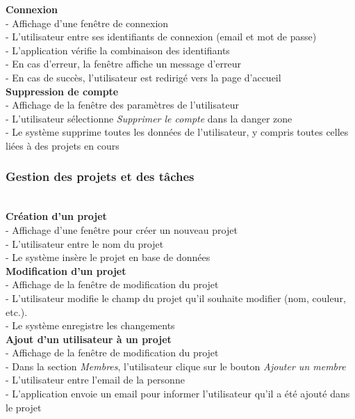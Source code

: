 \documentclass[conference]{IEEEtran}
\begin{document}
\textbf{Connexion}\\
- Affichage d'une fenêtre de connexion\\
- L'utilisateur entre ses identifiants de connexion (email et mot de passe)\\
- L'application vérifie la combinaison des identifiants\\
- En cas d'erreur, la fenêtre affiche un message d'erreur\\
- En cas de succès, l'utilisateur est redirigé vers la page d'accueil\\

\textbf{Suppression de compte}\\
- Affichage de la fenêtre des paramètres de l'utilisateur\\
- L'utilisateur sélectionne \textit{Supprimer le compte} dans la danger zone\\
- Le système supprime toutes les données de l'utilisateur, y compris toutes celles liées à des projets en cours\\

\subsubsection{Gestion des projets et des tâches}\hfil\\

\textbf{Création d'un projet}\\
- Affichage d'une fenêtre pour créer un nouveau projet\\
- L'utilisateur entre le nom du projet\\
- Le système insère le projet en base de données\\

\textbf{Modification d'un projet}\\
- Affichage de la fenêtre de modification du projet\\
- L'utilisateur modifie le champ du projet qu'il souhaite modifier (nom, couleur, etc.).\\
- Le système enregistre les changements\\

\textbf{Ajout d'un utilisateur à un projet}\\
- Affichage de la fenêtre de modification du projet\\
- Dans la section \textit{Membres}, l'utilisateur clique sur le bouton \textit{Ajouter un membre}\\
- L'utilisateur entre l'email de la personne\\
- L'application envoie un email pour informer l'utilisateur qu'il a été ajouté dans le projet\\
\end{document}
